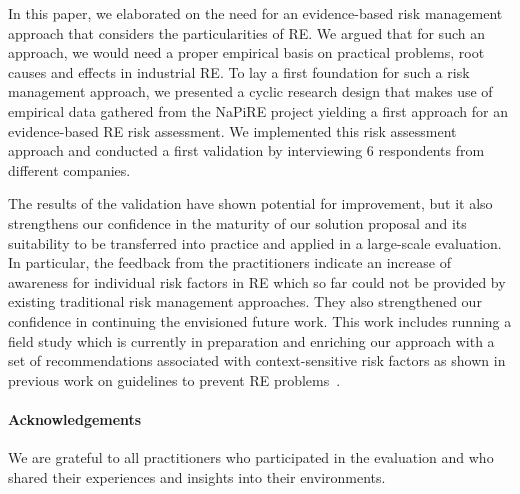 \documentclass[lnbip]{svmultln}
\begin{document}
In this paper, we elaborated on the need for an evidence-based risk management approach that considers the particularities of RE. We argued that for such an approach, we would need a proper empirical basis on practical problems, root causes and effects in industrial RE. To lay a first foundation for such a risk management approach, we presented a cyclic research design that makes use of empirical data gathered from the NaPiRE project yielding a first approach for an evidence-based RE risk assessment. We implemented this risk assessment approach and conducted a first validation by interviewing 6 respondents from different companies. 

The results of the validation have shown potential for improvement, but it also strengthens our confidence in the maturity of our solution proposal and its suitability to be transferred into practice and applied in a large-scale evaluation. In particular, the feedback from the practitioners indicate an increase of awareness for individual risk factors in RE which so far could not be provided by existing traditional risk management approaches. They also strengthened our confidence in continuing the envisioned future work. This work includes running a field study which is currently in preparation and enriching our approach with a set of recommendations associated with context-sensitive risk factors as shown in previous work on guidelines to prevent RE problems~\cite{kalinowski:swqd16, mafra2016}.

 


\paragraph{Acknowledgements}
We are grateful to all practitioners who participated in the evaluation and who shared their experiences and insights into their environments.




 
%
\end{document}
